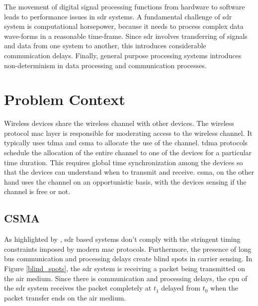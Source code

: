 
The movement of digital signal processing functions from hardware to software leads to performance issues in \ac{sdr} systems.
A fundamental challenge of \ac{sdr} system is computational horsepower, because it needs to process complex data wave-forms in a reasonable time-frame. Since \ac{sdr} involves transferring of signals and data from one system to another, this introduces considerable communication delays. Finally, general purpose processing systems introduces non-determinism in data processing and communication processes.\\


\section{Problem Context}
Wireless devices share the wireless channel with other devices. The wireless protocol \ac{mac} layer is responsible for moderating access to the wireless channel. It typically uses \ac{tdma} and \ac{csma} to allocate the use of the channel. \ac{tdma} protocols schedule the allocation of the entire channel to one of the devices for a particular time duration. This requires global time synchronization among the devices so that the devices can understand when to transmit and receive. \ac{csma}, on the other hand uses the channel on an opportunistic basis, with the devices sensing if the channel is free or not.\\

\subsection{CSMA}
As highlighted by \cite{schmid_experimental_2007}, \ac{sdr} based systems don't comply with the stringent timing constraints imposed by modern \ac{mac} protocols. Furthermore, the presence of long bus communication and processing delays create blind spots\cite{schmid_experimental_2007} in carrier sensing. In Figure \ref{blind_spots}, the \ac{sdr} system is receiving a packet being transmitted on the air medium. Since there is communication and processing delays, the \ac{cpu} of the \ac{sdr} system  receives the packet completely at $t_1$ delayed from $t_0$ when the packet transfer ends on the air medium.\\

